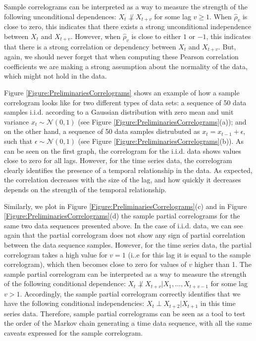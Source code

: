 Sample correlograms can be interpreted as a way to measure the strength of the following unconditional dependences: $X_t  \not\perp X_{t+v}$ for some lag $v \geq 1$.  When $\hat{\rho}_v$ is close to zero, this indicates that there exists a strong unconditional independence between $X_t$ and $X_{t+v}$. However, when $\hat{\rho}_v$ is close to either $1$ or $-1$, this indicates that there is a strong correlation or dependency between $X_t$ and $X_{t+v}$. But, again, we should never forget that when computing these Pearson correlation coefficients we are making a strong assumption about the normality of the data, which might not hold in the data.

Figure \ref{Figure:PreliminariesCorrelograms} shows an example of how a sample correlogram looks like for two different types of data sets: a sequence of 50 data samples i.i.d. according to a Gaussian distribution with zero mean and unit variance $x_t\sim {\mathcal N}(0,1)$ (see Figure \ref{Figure:PreliminariesCorrelograms}(a)); and on the other hand, a sequence of 50 data samples distrubuted as $x_t=x_{t-1} + \epsilon$, such that $\epsilon\sim {\mathcal N}(0,1)$ (see  Figure \ref{Figure:PreliminariesCorrelograms}(b)). As can be seen on the first graph, the correlogram for the i.i.d. data shows values close to zero for all lags. However, for the time series data, the correlogram clearly identifies the presence of a temporal relationship in the data. As expected, the correlation decreases with the size of the lag, and how quickly it decreases depends on the strength of the temporal relationship. 

Similarly, we plot in Figure \ref{Figure:PreliminariesCorrelograms}(c) and  in  Figure \ref{Figure:PreliminariesCorrelograms}(d) the sample partial correlograms for the same two data sequences presented above. In the case of i.i.d. data, we can see again that the partial correlogram does not show any sign of partial correlation between the data sequence samples. However, for the time series data, the partial correlogram takes a high value for $v=1$ (i..e for this lag it is equal to the sample correlogram), which then becomes close to zero for values of $v$ higher than 1. The sample partial correlogram can be interpreted as a way to measure the strength of the following conditional dependence: $X_t  \not\perp X_{t+v} | X_1,...,X_{t+v-1}$ for some lag $v>1$. Accordingly, the sample partial correlogram correctly identifies that we have the following conditional independencies: $X_t\perp X_{t+2}|X_{t+1}$ in this time series data. Therefore, sample partial correlograms can be seen as a tool to test the order of the Markov chain generating a time data sequence, with all the same caveats expressed for the sample correlogram. 

